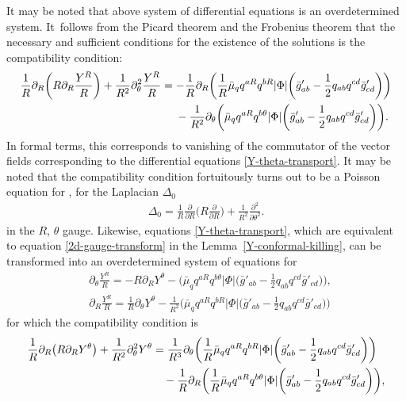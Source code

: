 \documentclass[11pt]{article}
\numberwithin{equation}{section}
\def\ptl{\partial}%
\def\halb{\frac{1}{2}}%
\numberwithin{equation}{section}
\begin{document}
It may be noted that above system of differential equations is an overdetermined system. It~follows from the Picard theorem and the Frobenius theorem that the necessary and sufficient conditions for the existence of the solutions is the compatibility condition:
\begin{gather*}
\frac{1}{R} \ptl_R \biggl(R \ptl_R \frac{Y^R}{R} \biggr) + \frac{1}{R^2} \ptl^2 _{\theta} \frac{Y^R}{R}=
- \frac{1}{R} \ptl_R \biggl(\frac{1}{R} \bar{\mu}_q q^{aR} q^{bR} \vert \Phi \vert \biggl(\bar{g}'_{ab} - \halb q_{ab} q^{cd} \bar{g}'_{cd}\biggr)\biggr) \notag\\
\hphantom{\frac{1}{R} \ptl_R \biggl(R \ptl_R \frac{Y^R}{R} \biggr) + \frac{1}{R^2} \ptl^2 _{\theta} \frac{Y^R}{R}=}{}
-\frac{1}{R^2} \ptl_ \theta \biggl(\bar{\mu}_q q^{aR} q^{b \theta} \vert \Phi \vert \biggl(\bar{g}'_{ab} - \halb q_{ab} q^{cd} \bar{g}'_{cd}\biggr)\biggr).
\end{gather*}
In formal terms, this corresponds to vanishing of the commutator of the vector fields corresponding to the differential equations \eqref{Y-theta-transport}.
It may be noted that the compatibility condition fortuitously turns out to be a Poisson equation for , for the Laplacian $\Delta_0$
\begin{align*}
\Delta_0 = \frac{1}{R} \frac{\ptl}{ \ptl R} \biggl(R \frac{\ptl }{\ptl R} \biggr) + \frac{1}{R^2} \frac{\ptl^2}{ \ptl \theta^2}.
\end{align*}
in the $R$, $\theta$ gauge. Likewise, equations \eqref{Y-theta-transport}, which are equivalent to equation \eqref{2d-gauge-transform} in the Lemma~\ref{Y-conformal-killing}, can be transformed into an overdetermined system of equations for 
\begin{align*}
&\ptl_\theta \frac{Y^R}{R}= - R \ptl_R Y^\theta - \biggl(\bar{\mu}_q q^{aR} q^{b\theta} \vert \Phi \vert \biggl(\bar{g}'_{ab} - \halb q_{ab} q^{cd} \bar{g}'_{cd}\biggr) \biggr), \\
&\ptl_R \frac{Y^R}{R}= \frac{1}{R} \ptl_\theta Y^\theta - \frac{1}{R^2} \biggl(\bar{\mu}_q q^{aR} q^{bR} \vert \Phi \vert \biggl(\bar{g}'_{ab} - \halb q_{ab} q^{cd} \bar{g}'_{cd}\biggr) \biggr)
\end{align*}
for which the compatibility condition is
\begin{align*}
\frac{1}{R} \ptl_R \bigl(R \ptl_R Y^\theta\bigr) + \frac{1}{R^2} \ptl^2_\theta Y^\theta &{}=
\frac{1}{R^3} \ptl_\theta \biggl(\frac{1}{R} \bar{\mu}_q q^{aR} q^{bR} \vert \Phi \vert \biggl(\bar{g}'_{ab} - \halb q_{ab} q^{cd} \bar{g}'_{cd}\biggr)\biggr) \notag\\
&\quad{}- \frac{1}{R} \ptl_R \biggl(\frac{1}{R} \bar{\mu}_q q^{aR} q^{b\theta} \vert \Phi \vert \biggl(\bar{g}'_{ab} - \halb q_{ab} q^{cd} \bar{g}'_{cd}\biggr)\biggr),
 \end{align*}
\end{document}
